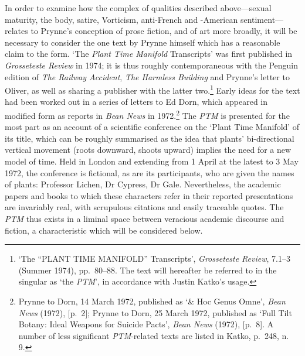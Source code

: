 \documentclass[]{article}
\begin{document}
In order to examine how the complex of qualities described above—sexual
maturity, the body, satire, Vorticism, anti-French and -American
sentiment—relates to Prynne’s conception of prose fiction, and of art
more broadly, it will be necessary to consider the one text by Prynne
himself which has a reasonable claim to the form. ‘The \emph{Plant Time
Manifold} Transcripts’ was first published in \emph{Grosseteste Review}
in 1974; it is thus roughly contemporaneous with the Penguin edition of
\emph{The Railway Accident}, \emph{The Harmless Building} and Prynne’s
letter to Oliver, as well as sharing a publisher with the latter
two.\footnote{‘The “PLANT TIME MANIFOLD” Transcripts’, \emph{Grosseteste
  Review}, 7.1–3 (Summer 1974), pp.~80–88. The text will hereafter be
  referred to in the singular as ‘the \emph{PTM}’, in accordance with
  Justin Katko’s usage.} Early ideas for the text had been worked out in
a series of letters to Ed Dorn, which appeared in modified form as
reports in \emph{Bean News} in 1972.\footnote{Prynne to Dorn, 14 March
  1972, published as ‘\& Hoc Genus Omne’, \emph{Bean News} (1972),
  {[}p.~2{]}; Prynne to Dorn, 25 March 1972, published as ‘Full Tilt
  Botany: Ideal Weapons for Suicide Pacts’, \emph{Bean News} (1972),
  {[}p.~8{]}. A number of less significant \emph{PTM}-related texts are
  listed in Katko, p.~248, n. 9.} The \emph{PTM} is presented for the
most part as an account of a scientific conference on the ‘Plant Time
Manifold’ of its title, which can be roughly summarised as the idea that
plants’ bi-directional vertical movement (roots downward, shoots upward)
implies the need for a new model of time. Held in London and extending
from 1 April at the latest to 3 May 1972, the conference is fictional,
as are its participants, who are given the names of plants: Professor
Lichen, Dr Cypress, Dr Gale. Nevertheless, the academic papers and books
to which these characters refer in their reported presentations are
invariably real, with scrupulous citations and easily traceable quotes.
The \emph{PTM} thus exists in a liminal space between veracious academic
discourse and fiction, a characteristic which will be considered below.
\end{document}
